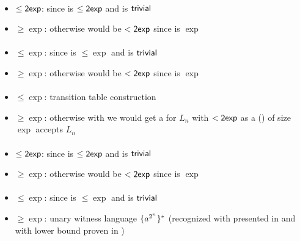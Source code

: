 \paragraph{\OLA{}\tto\TDFA}
\begin{itemize}
	\item $\le\mathsf{2exp}$: since \hyperref[cost:1LAto1DFA]{\OLA{}\tto\ODFA} is $\le\mathsf{2exp}$ and \ODFA{}\tto\TDFA is $\mathsf{trivial}$
	\item $\ge\exp$: otherwise \hyperref[cost:1LAto1DFA]{\OLA{}\tto\ODFA} would be $<\mathsf{2exp}$ since \hyperref[cost:2DFAto1DFA]{\TDFA{}\tto\ODFA} is $\exp$
\end{itemize}
\paragraph{\OLA{}\tto\TNFA}
\begin{itemize}
	\item $\le\exp$: since \hyperref[cost:1LAto1NFA]{\OLA{}\tto\ONFA} is $\le\exp$ and \ONFA{}\tto\TNFA is $\mathsf{trivial}$
	\item $\ge\exp$: otherwise \hyperref[cost:1LAto1DFA]{\OLA{}\tto\ODFA} would be $<\mathsf{2exp}$ since \TNFA{}\tto\ODFA is $\exp$
\end{itemize}
\paragraph{\ODLA{}\tto\ODFA}\label{cost:1DLAto1DFA}
\begin{itemize}
	\item $\le\exp$: transition table construction \cite{PigPis14}
	\item $\ge\exp$: otherwise with \hyperref[cost:1DLAto1DFA]{\ODLA{}\tto\ODFA} we would get a \ODFA for $L_n$ with $<\mathsf{2exp}$ as a \ODLA (\TDFA) of size $\exp$ accepts $L_n$ \cite{PigPis14}
\end{itemize}
\paragraph{\OLA{}\tto\ODLA}
\begin{itemize}
	\item $\le\mathsf{2exp}$: since \hyperref[cost:1LAto1DFA]{\OLA{}\tto\ODFA} is $\le\mathsf{2exp}$ and \ODFA{}\tto\ODLA is $\mathsf{trivial}$
	\item $\ge\exp$: otherwise \hyperref[cost:1LAto1DFA]{\OLA{}\tto\ODFA} would be $<\mathsf{2exp}$ since \ODLA{}\tto\ODFA is $\exp$
\end{itemize}
\paragraph{\ODLA{}\tto\TNFA}\label{cost:1DLAto2NFA}
\begin{itemize}
	\item $\le\exp$: since \hyperref[cost:1DLAto1DFA]{\ODLA{}\tto\ODFA} is $\le\exp$ and \ODFA{}\tto\TNFA is $\mathsf{trivial}$
	\item $\ge\exp$: unary witness language $\{a^{2^n}\}^*$ (recognized with \ODLA presented in \cite{PigPri19} and with \TNFA lower bound proven in \cite{MerPig00})
\end{itemize}
